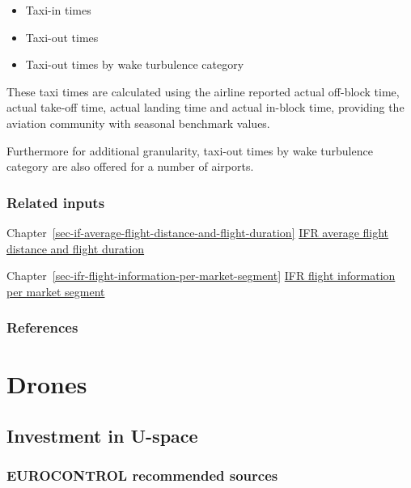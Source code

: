 \documentclass[
  11pt,
  a4paper,
]{book}
\begin{document}
\begin{itemize}
\item
  Taxi-in times
\item
  Taxi-out times
\item
  Taxi-out times by wake turbulence category
\end{itemize}

These taxi times are calculated using the airline reported actual
off-block time, actual take-off time, actual landing time and actual
in-block time, providing the aviation community with seasonal benchmark
values.

Furthermore for additional granularity, taxi-out times by wake
turbulence category are also offered for a number of airports.

\hypertarget{related-inputs-26}{%
\section{Related inputs}\label{related-inputs-26}}

Chapter~\ref{sec-if-average-flight-distance-and-flight-duration}
\protect\hyperlink{sec-if-average-flight-distance-and-flight-duration}{IFR
average flight distance and flight duration}

Chapter~\ref{sec-ifr-flight-information-per-market-segment}
\protect\hyperlink{sec-ifr-flight-information-per-market-segment}{IFR
flight information per market segment}

\hypertarget{references-32}{%
\section{References}\label{references-32}}

\part{Drones}

\hypertarget{sec-investment-in-u-space}{%
\chapter{Investment in U-space}\label{sec-investment-in-u-space}}

\hypertarget{eurocontrol-recommended-sources-2}{%
\section{EUROCONTROL recommended
sources}\label{eurocontrol-recommended-sources-2}}
\end{document}
